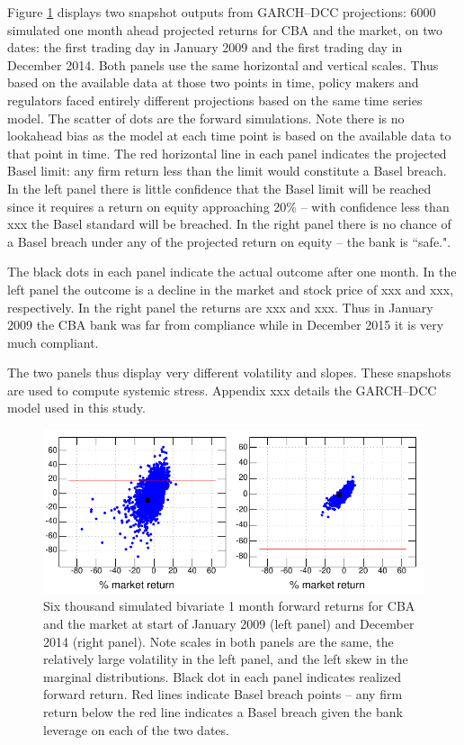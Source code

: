 \documentclass[authoryear]{elsarticle}
\newcommand{\fref}[1]{Figure \ref{#1}}
\begin{document}
 \fref{simulation}   displays two snapshot outputs from GARCH--DCC projections:  6000  simulated one month ahead projected returns for  CBA and the market, on  two dates: the first trading day in January 2009 and the first trading day in December 2014.    Both panels use the same horizontal and vertical scales.   Thus based on the available data at those two points in  time, policy makers and regulators faced entirely different projections based on the same time series model.   The scatter of dots are the forward simulations.  Note there is no lookahead bias as the model at each time point is based on the available data to that point in time.    The red horizontal line in each panel indicates the projected Basel limit:  any firm return less than the limit would constitute a Basel breach.   In the left panel there is little confidence that the Basel limit will be reached since it requires a return on equity approaching 20\% -- with confidence less than xxx the Basel standard will be breached.  In the right panel there is no chance of a Basel breach under any of the projected return on equity -- the bank is ``safe.".   
 
 The black dots in each panel indicate the actual outcome after one month.    In the left panel the outcome is a decline in the market and stock price of xxx and xxx, respectively.    In the right panel the returns are xxx and xxx.    Thus in January  2009 the CBA bank was far from compliance while in December 2015 it is very much compliant.  
 
 The two panels thus display very different volatility and slopes.  These snapshots are used to compute systemic stress.   Appendix xxx details the GARCH--DCC model used in this study.

\begin{figure}[htbp]
\begin{center}
\includegraphics{simulation.pdf}
\caption{Six thousand simulated bivariate 1 month forward returns for CBA and the market at start of January 2009 (left panel)  and December 2014 (right panel). Note scales in both panels are the same, the relatively large volatility in the left panel, and the left skew in the  marginal distributions.  Black dot in each panel indicates realized forward return.   Red lines indicate Basel breach points -- any firm return below the red line indicates a Basel breach given the bank leverage on each of the two dates.}
\label{simulation}
\end{center}
\end{figure}
\end{document}
